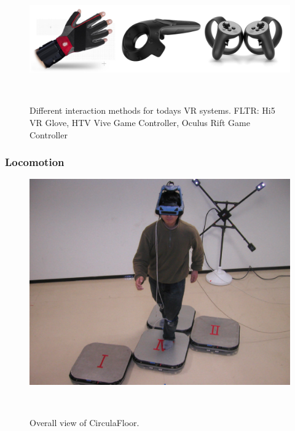 \begin{figure}
	\centering
	\includegraphics[width=0.99\columnwidth]{./figures/interaction}
	\caption[Game Controllers]{Different interaction methods for todays VR systems. FLTR: Hi5 VR Glove, HTV Vive Game Controller, Oculus Rift Game Controller~\footnotemark}~\label{fig:interaction}
\end{figure}

\subsubsection{Locomotion}
\label{sec:locomotion}

\begin{figure}
	\centering
	\includegraphics[width=0.99\columnwidth]{./figures/01381227}
	\caption{Overall view of CirculaFloor.}~\label{fig:cirFloor}
\end{figure}

